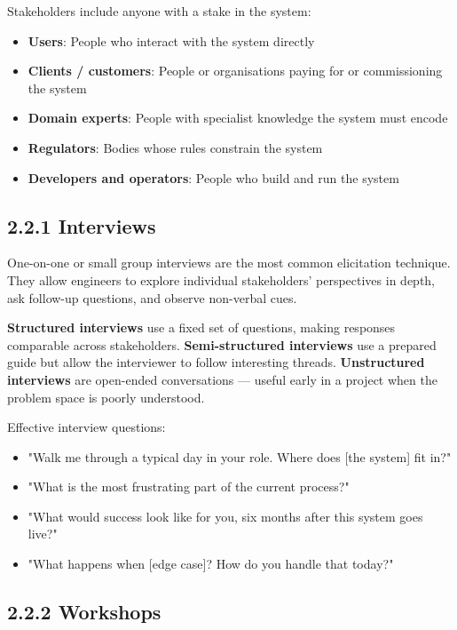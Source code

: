 \documentclass[11pt,a4paper]{book}
\begin{document}
Stakeholders include anyone with a stake in the system:

\begin{itemize}
  \item \textbf{Users}: People who interact with the system directly
  \item \textbf{Clients / customers}: People or organisations paying for or commissioning the system
  \item \textbf{Domain experts}: People with specialist knowledge the system must encode
  \item \textbf{Regulators}: Bodies whose rules constrain the system
  \item \textbf{Developers and operators}: People who build and run the system
\end{itemize}

\subsection{2.2.1 Interviews}

One-on-one or small group interviews are the most common elicitation technique. They allow engineers to explore individual stakeholders' perspectives in depth, ask follow-up questions, and observe non-verbal cues.

\textbf{Structured interviews} use a fixed set of questions, making responses comparable across stakeholders. \textbf{Semi-structured interviews} use a prepared guide but allow the interviewer to follow interesting threads. \textbf{Unstructured interviews} are open-ended conversations --- useful early in a project when the problem space is poorly understood.

Effective interview questions:
\begin{itemize}
  \item "Walk me through a typical day in your role. Where does [the system] fit in?"
  \item "What is the most frustrating part of the current process?"
  \item "What would success look like for you, six months after this system goes live?"
  \item "What happens when [edge case]? How do you handle that today?"
\end{itemize}

\subsection{2.2.2 Workshops}
\end{document}
